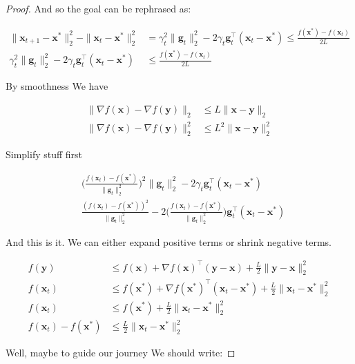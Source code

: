 \documentclass{article}
\begin{document}
\begin{proof}
	And so the goal can be rephrased as:
	
	\begin{align}
		\|\mathbf{x}_{t+1} - \mathbf{x}^*\|^2_2 - \|\mathbf{x}_{t} - \mathbf{x}^*\|^2_2 &= \gamma_t^2\|\mathbf{g}_t\|^2_2 - 2 \gamma_t\mathbf{g}^\top_t(\mathbf{x}_t - \mathbf{x}^*)  \le \frac{f(\mathbf{x}^*) - f(\mathbf{x}_t)}{2L}\\
		\gamma_t^2\|\mathbf{g}_t\|^2_2 - 2 \gamma_t\mathbf{g}^\top_t(\mathbf{x}_t - \mathbf{x}^*)  &\le \frac{f(\mathbf{x}^*) - f(\mathbf{x}_t)}{2L}
	\end{align}
	
	By smoothness We have
	
	\begin{align}
		\|\nabla f(\mathbf{x}) - \nabla f(\mathbf{y}) \|_2 &\le L\|\mathbf{x} - \mathbf{y}\|_2 \\
		\|\nabla f(\mathbf{x}) - \nabla f(\mathbf{y}) \|^2_2 &\le L^2\|\mathbf{x} - \mathbf{y}\|^2_2
	\end{align}
	
	Simplify stuff first
	
	\begin{align}
		&\bigg(\frac{f(\mathbf{x}_t) - f(\mathbf{x}^*)}{\|\mathbf{g}_t\|^2_2}\bigg)^2 \|\mathbf{g}_t\|^2_2 - 2 \gamma_t\mathbf{g}^\top_t(\mathbf{x}_t - \mathbf{x}^*)\\
		&\frac{(f(\mathbf{x}_t) - f(\mathbf{x}^*))^2}{\|\mathbf{g}_t\|^2_2} - 2 \bigg(\frac{f(\mathbf{x}_t) - f(\mathbf{x}^*)}{\|\mathbf{g}_t\|^2_2}\bigg)\mathbf{g}^\top_t(\mathbf{x}_t - \mathbf{x}^*)
	\end{align}
	
	And this is it. We can either expand positive terms or shrink negative terms. 
	
	\begin{align}
		f(\mathbf{y}) &\le f(\mathbf{x}) + \nabla f(\mathbf{x})^\top (\mathbf{y} - \mathbf{x}) + \frac{L}{2}\|\mathbf{y} - \mathbf{x}\|^2_2\\
		f(\mathbf{x}_t) &\le f(\mathbf{x}^*) + \nabla f(\mathbf{x}^*)^\top (\mathbf{x}_t - \mathbf{x}^*) + \frac{L}{2}\|\mathbf{x}_t - \mathbf{x}^*\|^2_2\\
		f(\mathbf{x}_t) &\le f(\mathbf{x}^*) + \frac{L}{2}\|\mathbf{x}_t - \mathbf{x}^*\|^2_2\\
		f(\mathbf{x}_t) -  f(\mathbf{x}^*) &\le \frac{L}{2}\|\mathbf{x}_t - \mathbf{x}^*\|^2_2
	\end{align}


	Well, maybe to guide our journey We should write:
	

\end{proof}
\end{document}
